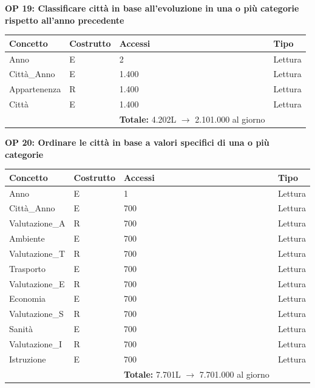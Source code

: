 \documentclass[a4paper,12pt]{report}
\begin{document}
            \textbf{OP 19: Classificare città in base all’evoluzione in una o più categorie rispetto all’anno precedente}
        	\begin{table}[H]
            \centering
             \begin{tabular}{llll}
             \rowcolor{yellow!20} \textbf{Concetto} & \textbf{Costrutto} & \textbf{Accessi} & \textbf{Tipo}\\ [0.5ex] 
             \hline
             Anno & E & 2 & Lettura \\ 
             Città\_Anno & E & 1.400 & Lettura \\ 
             Appartenenza & R & 1.400 & Lettura \\ 
             Città & E & 1.400 & Lettura \\ 
             \hline
                \rowcolor{yellow!20} &   & \textbf{Totale:} 4.202L $\rightarrow$ 2.101.000 al giorno &  \\ [1ex] 
             
             \end{tabular}
            \end{table}

            \textbf{OP 20: Ordinare le città in base a valori specifici di una o più categorie}
        	\begin{table}[H]
            \centering
             \begin{tabular}{llll}
             \rowcolor{yellow!20} \textbf{Concetto} & \textbf{Costrutto} & \textbf{Accessi} & \textbf{Tipo}\\ [0.5ex] 
             \hline
             Anno & E & 1 & Lettura \\ 
             Città\_Anno & E & 700 & Lettura \\ 
             Valutazione\_A & R & 700 & Lettura \\ 
             Ambiente & E & 700 & Lettura \\
             Valutazione\_T & R & 700 & Lettura \\ 
             Trasporto & E & 700 & Lettura \\
             Valutazione\_E & R & 700 & Lettura \\ 
             Economia & E & 700 & Lettura \\
             Valutazione\_S & R & 700 & Lettura \\ 
             Sanità & E & 700 & Lettura \\
             Valutazione\_I & R & 700 & Lettura \\ 
             Istruzione & E & 700 & Lettura \\
             \hline
                \rowcolor{yellow!20} &   & \textbf{Totale:} 7.701L $\rightarrow$ 7.701.000 al giorno &  \\ [1ex] 
             
             \end{tabular}
            \end{table}
\end{document}
